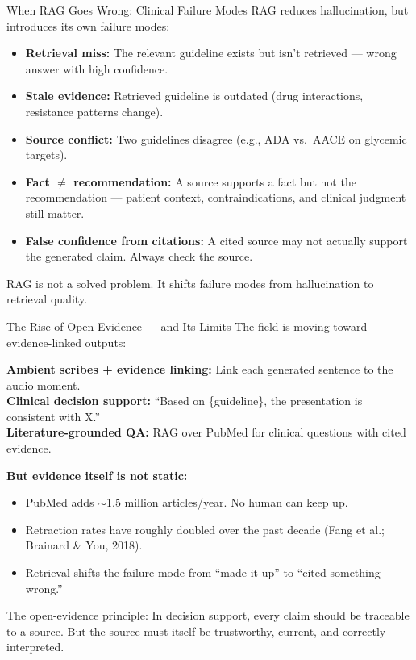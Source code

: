 \documentclass[aspectratio=169,11pt]{beamer}
\begin{document}
\begin{frame}{When RAG Goes Wrong: Clinical Failure Modes}
RAG reduces hallucination, but introduces its own failure modes:

\vspace{0.2em}
\small
\begin{itemize}\setlength\itemsep{0.05em}
  \item \textbf{Retrieval miss:} The relevant guideline exists but isn't retrieved --- wrong answer with high confidence.
  \item \textbf{Stale evidence:} Retrieved guideline is outdated (drug interactions, resistance patterns change).
  \item \textbf{Source conflict:} Two guidelines disagree (e.g., ADA vs.\ AACE on glycemic targets).
  \item \textbf{Fact $\neq$ recommendation:} A source supports a fact but not the recommendation --- patient context, contraindications, and clinical judgment still matter.
  \item \textbf{False confidence from citations:} A cited source may not actually support the generated claim. Always check the source.
\end{itemize}

\vspace{0.1em}
\alert{RAG is not a solved problem.} It shifts failure modes from hallucination to retrieval quality.
\end{frame}

\begin{frame}{The Rise of Open Evidence --- and Its Limits}
The field is moving toward evidence-linked outputs:

\vspace{0.2em}
\small
\textbf{Ambient scribes + evidence linking:} Link each generated sentence to the audio moment.\\
\textbf{Clinical decision support:} ``Based on \{guideline\}, the presentation is consistent with X.''\\
\textbf{Literature-grounded QA:} RAG over PubMed for clinical questions with cited evidence.

\vspace{0.3em}
\textbf{But evidence itself is not static:}
\begin{itemize}\setlength\itemsep{0em}
  \item PubMed adds $\sim$1.5 million articles/year. No human can keep up.
  \item Retraction rates have roughly doubled over the past decade (Fang et al.; Brainard \& You, 2018).
  \item Retrieval shifts the failure mode from ``made it up'' to ``cited something wrong.''
\end{itemize}

\vspace{0.2em}
\alert{The open-evidence principle:} In decision support, every claim should be traceable to a source. But the source must itself be trustworthy, current, and correctly interpreted.
\end{frame}
\end{document}
